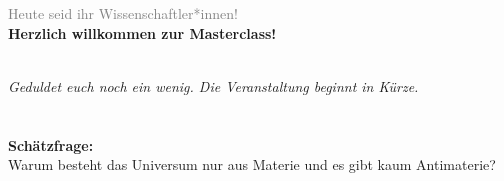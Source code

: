 


\begin{frame}
\, \vspace{-1.75cm}  \Large  \begin{center}
\textcolor{LHCbDarkBlue}{\Event}\\\textcolor{gray}{\small Heute seid ihr Wissenschaftler*innen!} \\  \vspace{2.25cm}
    \textbf{Herzlich willkommen zur Masterclass!} 
\end{center} 
  \small \, \vspace{1cm} \\
    \emph{Geduldet euch noch ein wenig. Die Veranstaltung beginnt in Kürze.}
\end{frame}
\section{}


\begin{frame} \Large
    \begin{center}
     \textcolor{LHCbDarkBlue}{\textbf{Schätzfrage:} }\\  \vspace{1cm}
     Warum besteht das Universum nur aus Materie und es gibt kaum Antimaterie?
    \end{center}
    \begin{center}  \vspace{1cm}\pause
    \end{center}
\end{frame}

